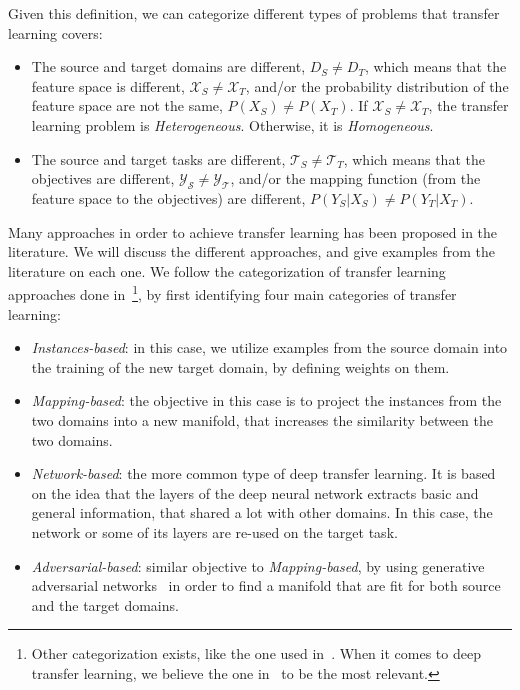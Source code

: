   \par Given this definition, we can categorize different types of problems that transfer learning covers:

  \begin{itemize}
      \item The source and target domains are different, $D_S \neq D_T$, which means that the feature space is different, $\mathcal{X}_S \neq \mathcal{X}_T$, and/or the probability distribution of the feature space are not the same, $P(X_S) \neq P(X_T)$. If $\mathcal{X}_S \neq \mathcal{X}_T$, the transfer learning problem is \textit{Heterogeneous}. Otherwise, it is \textit{Homogeneous}.

      \item The source and target tasks are different, $\mathcal{T}_S \neq \mathcal{T}_T$, which means that the objectives are different, $\mathcal{Y_S} \neq \mathcal{Y_T}$, and/or the mapping function (from the feature space to the objectives) are different, $P(Y_S|X_S) \neq P(Y_T|X_T)$.
  \end{itemize}

  \par Many approaches in order to achieve transfer learning has been proposed in the literature. We will discuss the different approaches, and give examples from the literature on each one. We follow the categorization of transfer learning approaches done in~\citep{dtl2018survey}\footnote{Other categorization exists, like the one used in~\citep{weiss2016survey}. When it comes to deep transfer learning, we believe the one in~\citep{dtl2018survey} to be the most relevant.}, by first identifying four main categories of transfer learning:
  \begin{itemize}
    \item \textit{Instances-based}: in this case, we utilize examples from the source domain into the training of the new target domain, by defining weights on them.
    \item \textit{Mapping-based}: the objective in this case is to project the instances from the two domains into a new manifold, that increases the similarity between the two domains.
    \item \textit{Network-based}: the more common type of deep transfer learning. It is based on the idea that the layers of the deep neural network extracts basic and general information, that shared a lot with other domains. In this case, the network or some of its layers are re-used on the target task.
    \item \textit{Adversarial-based}: similar objective to \textit{Mapping-based}, by using generative adversarial networks~\citep{goodfellow2014generative} in order to find a manifold that are fit for both source and the target domains.
  \end{itemize}

